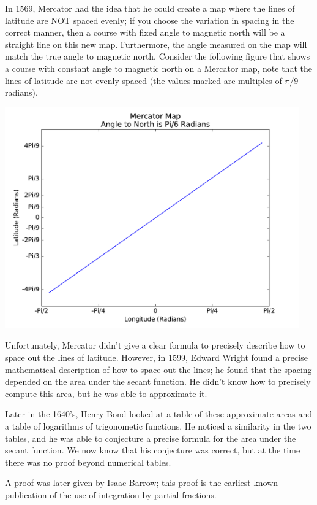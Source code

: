 In 1569, Mercator had the idea that he could create a map where the lines of latitude are NOT spaced evenly; if you choose the variation in spacing in the correct manner, then a course with fixed angle to magnetic north will be a straight line on this new map. 
Furthermore, the angle measured on the map will match the true angle to magnetic north.
Consider the following figure that shows a course with constant angle to magnetic north on a Mercator map, note that the lines of latitude are not evenly spaced (the values marked are multiples of \(\pi/9\) radians).

\includegraphics[width = 5in]{oneVarIntCalc/mercator.pdf}

Unfortunately, Mercator didn't give a clear formula to precisely describe how to space out the lines of latitude. 
However, in 1599, Edward Wright found a precise mathematical description of how to space out the lines; he found that the spacing depended on the area under the secant function.
He didn't know how to precisely compute this area, but he was able to approximate it. 

Later in the 1640's, Henry Bond looked at a table of these approximate areas and a table of logarithms of trigonometic functions. 
He noticed a similarity in the two tables, and he was able to conjecture a precise formula for the area under the secant function. 
We now know that his conjecture was correct, but at the time there was no proof beyond numerical tables.

A proof was later given by Isaac Barrow; this proof is the earliest known publication of the use of integration by partial fractions.

